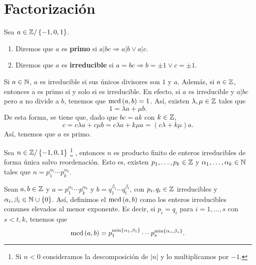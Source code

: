 \section{Factorización}
\begin{definition}
	Sea $\displaystyle a \in \mathbb{Z} / \left\{ -1, 0, 1\right\}  $. 
	\begin{enumerate}
	\item Diremos que $\displaystyle a $ es \textbf{primo} si $\displaystyle a | bc \Rightarrow a | b \lor a | c $.
	\item Diremos que $\displaystyle a $ es \textbf{irreducible} si $\displaystyle a = bc \Rightarrow b = \pm 1 \lor c = \pm 1 $.
	\end{enumerate}
\end{definition}
\begin{observation}
Si $\displaystyle a \in \mathbb{N} $, $\displaystyle a $ es irreducible si sus únicos divisores son $\displaystyle 1 $ y $\displaystyle a $. Además, si $\displaystyle a \in \mathbb{Z} $, entonces a es primo si y solo si es irreducible. En efecto, si $\displaystyle a $ es irreducible y $\displaystyle a |bc $ pero $\displaystyle a $ no divide a $\displaystyle b $, tenemos que $\displaystyle \text{mcd}\left(a,b\right) = 1 $. Así, existen $\displaystyle \lambda, \mu \in \mathbb{Z} $ tales que 
\[1 = \lambda a + \mu b .\]
De esta forma, se tiene que, dado que $\displaystyle bc = ak $ con $\displaystyle k \in \mathbb{Z} $,
\[ c = c\lambda a + c \mu b = c\lambda a + k\mu a = \left(c\lambda + k\mu \right)a.\]
Así, tenemos que $\displaystyle a $ es primo.
\end{observation}
\begin{theorem}
	Sea $\displaystyle n \in \mathbb{Z} / \left\{ -1, 0, 1\right\}  $ \footnote{Si $\displaystyle n < 0 $ consideramos la descomposición de $\displaystyle \left|n\right| $ y lo multiplicamos por $\displaystyle -1 $.} , entonces $\displaystyle n $ es producto finito de enteros irreducibles de forma única salvo reordenación. Esto es, existen $\displaystyle p_{1}, \ldots, p_{k} \in \mathbb{Z} $ y $\displaystyle \alpha_{1}, \ldots, \alpha_{k} \in \mathbb{N} $ tales que $\displaystyle n = p_{1}^{\alpha_{1}} \cdots p_{k}^{\alpha_{k}} $.
\end{theorem}
\begin{colorary}
	Sean $\displaystyle a,b \in \mathbb{Z} $ y $\displaystyle a = p_{1}^{\alpha_{1}} \cdots p_{k}^{\alpha_{k}} $ y $\displaystyle b = q_{1}^{\beta _{1}} \cdots q_{t}^{\beta_{t}} $, con $\displaystyle p_{i}, q_{i} \in \mathbb{Z} $ irreducibles y $\displaystyle \alpha_{i}, \beta_{i} \in \mathbb{N} \cup \left\{ 0\right\}  $. Así, definimos el $\displaystyle \text{mcd}\left(a,b\right) $ como los enteros irreducibles comunes elevados al menor exponente. Es decir, si $\displaystyle p_{i} = q_{i} $ para $\displaystyle i = 1, \ldots, s $ con $\displaystyle s < t, k $, tenemos que
	\[\text{mcd}\left(a,b\right) = p_{1}^{\min \left\{ \alpha_{1}, \beta_{1}\right\} } \cdots p_{s}^{\min \left\{ \alpha_{s}, \beta _{s}\right\} } .\]
\end{colorary}
